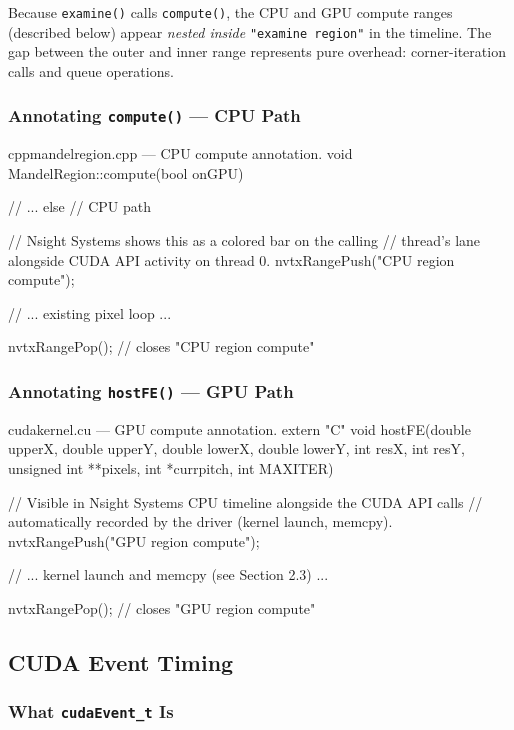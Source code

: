 \documentclass[
	english,
	letterpaper, oneside
]{article}
\begin{document}
Because \texttt{examine()} calls \texttt{compute()}, the CPU and GPU
compute ranges (described below) appear \emph{nested inside}
\texttt{"examine region"} in the timeline. The gap between the outer and
inner range represents pure overhead: corner-iteration calls and queue
operations.

\subsubsection{Annotating \texttt{compute()} — CPU Path}

\begin{sourcecode}{cpp}{mandelregion.cpp — CPU compute annotation.}
void MandelRegion::compute(bool onGPU)
{
    // ...
    else // CPU path
    {
        // Nsight Systems shows this as a colored bar on the calling
        // thread's lane alongside CUDA API activity on thread 0.
        nvtxRangePush("CPU region compute");

        // ... existing pixel loop ...

        nvtxRangePop(); // closes "CPU region compute"
    }
}
\end{sourcecode}

\subsubsection{Annotating \texttt{hostFE()} — GPU Path}

\begin{sourcecode}{cuda}{kernel.cu — GPU compute annotation.}
extern "C" void hostFE(double upperX, double upperY, double lowerX,
                       double lowerY, int resX, int resY,
                       unsigned int **pixels, int *currpitch, int MAXITER)
{
    // Visible in Nsight Systems CPU timeline alongside the CUDA API calls
    // automatically recorded by the driver (kernel launch, memcpy).
    nvtxRangePush("GPU region compute");

    // ... kernel launch and memcpy (see Section 2.3) ...

    nvtxRangePop(); // closes "GPU region compute"
}
\end{sourcecode}

\subsection{CUDA Event Timing}

\subsubsection{What \texttt{cudaEvent\_t} Is}
\end{document}
